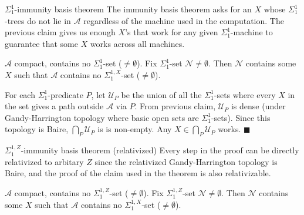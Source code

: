 \begin{frame}{$\Sigma_1^1$-immunity basis theorem}
  The immunity basis theorem asks for an $X$ whose $\Sigma_1^1$-trees do
  not lie in $\mathcal{A}$ regardless of the machine used in the
  computation. The previous claim gives us enough $X$'s that work for any
  given $\Sigma_1^1$-machine to guarantee that some $X$ works across all
  machines.

  \vspace{1em}
  \begin{immunity*}
    $\mathcal{A}$ compact, contains no $\Sigma_1^{1}$-set
    ($\neq\emptyset$). Fix $\Sigma_1^{1}$-set
    $\mathcal{N}\neq\emptyset$. Then $\mathcal{N}$ contains some $X$ such
    that $\mathcal{A}$ contains no $\Sigma_1^{1,X}$-set ($\neq\emptyset$).
  \end{immunity*}

  \vspace{1em}
  For each $\Sigma_1^1$-predicate $P$, let $\mathcal{U}_P$ be the union of
  all the $\Sigma_1^1$-sets where every $X$ in the set gives a path outside
  $\mathcal{A}$ via $P$. From previous claim, $\mathcal{U}_P$ is dense
  (under Gandy-Harrington topology where basic open sets are
  $\Sigma_1^1$-sets). Since this topology is Baire,
  $\bigcap_P\mathcal{U}_P$ is is non-empty. Any
  $X\in\bigcap_P\mathcal{U}_P$ works. $\blacksquare$
\end{frame}

\begin{frame}{$\Sigma_1^{1,Z}$-immunity basis theorem (relativized)}
  Every step in the proof can be directly relativized to arbitary $Z$ since
  the relativized Gandy-Harrington topology is Baire, and the proof of the
  claim used in the theorem is also relativizable.

  \vspace{0.5em}
  \begin{immunity*}[Relativized]
    $\mathcal{A}$ compact, contains no $\Sigma_1^{1,Z}$-set
    ($\neq\emptyset$). Fix $\Sigma_1^{1,Z}$-set
    $\mathcal{N}\neq\emptyset$. Then $\mathcal{N}$ contains some $X$ such
    that $\mathcal{A}$ contains no $\Sigma_1^{1,X}$-set ($\neq\emptyset$).
  \end{immunity*}
\end{frame}

